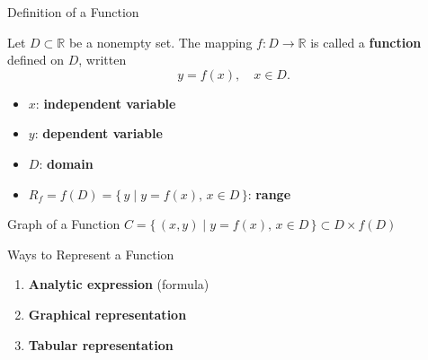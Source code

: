 \documentclass[aspectratio=169,10pt]{beamer}
\begin{document}
\begin{frame}{Definition of a Function}
  \begin{definition}[Function]
    Let $D\subset\mathbb{R}$ be a nonempty set.
    The mapping $f\colon D\to\mathbb{R}$ is called a \textbf{function} defined on $D$, written
    \[
      y = f(x),\quad x\in D.
    \]
  \end{definition}
  \pause
  \begin{itemize}
    \item $x$: \textbf{independent variable}
    \item $y$: \textbf{dependent variable}
    \item $D$: \textbf{domain}
    \item $R_f = f(D) = \{\,y\mid y=f(x),\, x\in D\,\}$: \textbf{range}
  \end{itemize}
  \pause
  \begin{block}{Graph of a Function}
    $C = \{\,(x,y)\mid y=f(x),\, x\in D\,\}\subset D\times f(D)$
  \end{block}
\end{frame}

\begin{frame}{Ways to Represent a Function}
  \begin{enumerate}
    \item<1-> \textbf{Analytic expression} (formula)
    \item<2-> \textbf{Graphical representation}
    \item<3-> \textbf{Tabular representation}
  \end{enumerate}
  \vfill
  \onslide<4->{
    \begin{example}[Absolute Value Function]
      $y = |x| = \begin{cases} x, & x\ge 0, \\ -x, & x<0. \end{cases}$
      \quad Domain $(-\infty,+\infty)$, Range $[0,+\infty)$
    \end{example}
  }
  \vfill
\end{frame}
\end{document}
